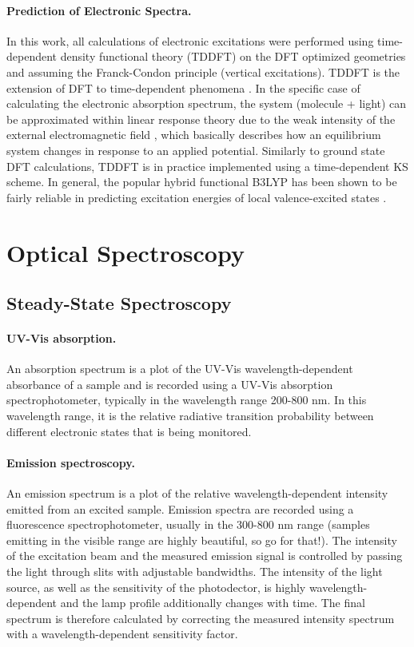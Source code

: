  \paragraph{Prediction of Electronic Spectra.} In this work, all calculations of electronic excitations were performed using time-dependent density functional theory (TDDFT) on the DFT optimized geometries and assuming the Franck-Condon principle (vertical excitations). TDDFT is the extension of DFT to time-dependent phenomena \cite{Marques2004,Burke2005}. In the specific case of calculating the electronic absorption spectrum, the system (molecule + light) can be approximated within linear response theory due to the weak intensity of the external electromagnetic field \cite{Marques2004}, which basically describes how an equilibrium system changes in response to an applied potential. Similarly to ground state DFT calculations, TDDFT is in practice implemented using a time-dependent KS scheme. In general, the popular hybrid functional B3LYP has been shown to be fairly reliable in predicting excitation energies of local valence-excited states \cite{Grimme2004,Silva2008}.

\section{Optical Spectroscopy}
\subsection{Steady-State Spectroscopy}

 \paragraph{UV-Vis absorption.} An absorption spectrum is a plot of the UV-Vis wavelength-dependent absorbance of a sample and is recorded using a UV-Vis absorption spectrophotometer, typically in the wavelength range 200-800 nm. In this wavelength range, it is the relative radiative transition probability between different electronic states that is being monitored.

 \paragraph{Emission spectroscopy.} An emission spectrum is a plot of the relative wavelength-dependent intensity emitted from an excited sample. Emission spectra are recorded using a fluorescence spectrophotometer, usually in the 300-800 nm range (samples emitting in the visible range are highly beautiful, so go for that!). The intensity of the excitation beam and the measured emission signal is controlled by passing the light through slits with adjustable bandwidths. The intensity of the light source, as well as the sensitivity of the photodector, is highly wavelength-dependent and the lamp profile additionally changes with time. The final spectrum is therefore calculated by correcting the measured intensity spectrum with a wavelength-dependent sensitivity factor.\cite{Lak}

